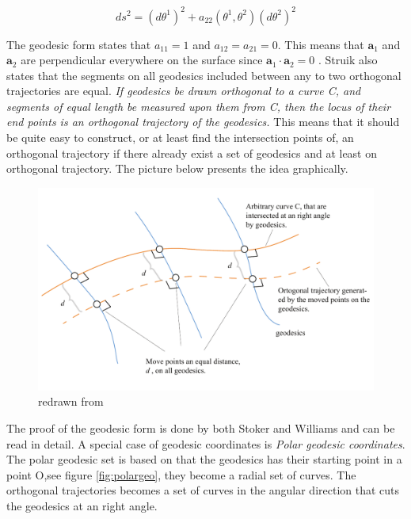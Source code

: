 \begin{equation}\label{geodesicForm}
    ds^2 = (d\theta^1)^2 + a_{22}(\theta^1,\theta^2)(d\theta^2)^2
\end{equation}

The geodesic form states that $a_{11} = 1$ and $a_{12}=a_{21} = 0$. This means that $\textbf{a}_1$ and $\textbf{a}_2$ are perpendicular everywhere on the surface since $\textbf{a}_1 \cdot \textbf{a}_2 = 0$ . 
Struik also states that the segments  on all geodesics included  between any to two orthogonal  trajectories are equal.
\textit{ If geodesics be drawn orthogonal to a curve C, and segments of equal length be measured upon them from C, then the locus of their end points is an orthogonal trajectory of the geodesics.} This means that it should be quite easy to construct, or at least find the intersection points of, an orthogonal trajectory if there already exist a set of geodesics and at least on orthogonal trajectory. The picture below presents the idea graphically.

\begin{figure}[H]
\centering
\includegraphics[width=1.0\linewidth ]{figure/Theory/geoDesicCoord2.pdf}
\caption{redrawn from \cite{ref:Struik}   }
\label{fig:geoCord}
\end{figure}

The proof of the geodesic form is done by both Stoker \cite{ref:Stoker} and Williams \cite{ref:Williams} and can be read in detail. A special case of geodesic coordinates is \textit{Polar geodesic coordinates}. The polar geodesic set is based on that the geodesics has their starting point in a point O,see figure \ref{fig:polargeo}, they become a radial set of curves. The orthogonal trajectories becomes a set of curves in the angular direction that cuts the geodesics at an right angle. 

